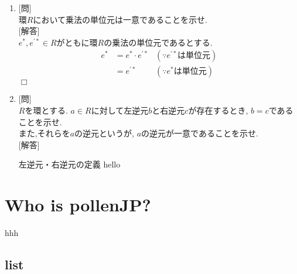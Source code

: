 \documentclass{jsarticle}           %
\theoremstyle{plain}
\theoremstyle{definition}
\theoremstyle{remark}
\begin{document}
\begin{enumerate}[label=\fbox{\arabic*}]
  \item
        {[問]}\\
        環$R$において乗法の単位元は一意であることを示せ.\\
        {[解答]}\\
        $e^{*}, e^{'*} \in R$がともに環$R$の乗法の単位元であるとする.
        \begin{align*}
          e^{*} & = e^{*} \cdot e^{'*} & (\because e^{'*} \text{は単位元}) \\
                & = e^{'*}             & (\because e^{*} \text{は単位元})  
        \end{align*}
        \hfill $\Box$
        
  \item
        {[問]}\\
        $R$を環とする. $a \in R$に対して左逆元$b$と右逆元$c$が存在するとき, $b=c$であることを示せ.\\
        また,それらを$a$の逆元というが, $a$の逆元が一意であることを示せ.\\
        {[解答]}\\
        \begin{itembox}[l]{左逆元・右逆元の定義}
          hello
        \end{itembox}
\end{enumerate}

    
\section{Who is pollenJP?}
\begin{tcolorbox}
  hhh
\end{tcolorbox}

\subsection{list}
\end{document}
